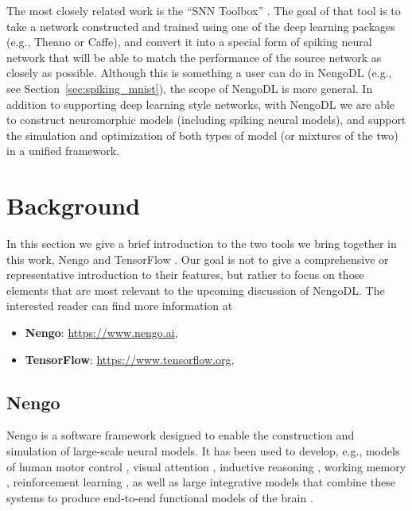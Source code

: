 \documentclass{article}
\begin{document}
The most closely related work is the ``SNN Toolbox'' \citep{Rueckauer2017}.  The goal of that tool is to take a network constructed and trained using one of the deep learning packages (e.g., Theano or Caffe), and convert it into a special form of spiking neural network that will be able to match the performance of the source network as closely as possible.  Although this is something a user can do in NengoDL (e.g., see Section~\ref{sec:spiking_mnist}), the scope of NengoDL is more general.  In addition to supporting deep learning style networks, with NengoDL we are able to construct neuromorphic models (including spiking neural models), and support the simulation and optimization of both types of model (or mixtures of the two) in a unified framework.

\section{Background}
\label{sec:background}

In this section we give a brief introduction to the two tools we bring together in this work, Nengo \citep{Bekolay2014} and TensorFlow \citep{Abadi2016}.  Our goal is not to give a comprehensive or representative introduction to their features, but rather to focus on those elements that are most relevant to the upcoming discussion of NengoDL.  The interested reader can find more information at

\begin{itemize}
\item {\bf Nengo}: \url{https://www.nengo.ai}, \citet{Bekolay2014}
\item {\bf TensorFlow}: \url{https://www.tensorflow.org}, \citet{Abadi2016}
\end{itemize}

\subsection{Nengo}

Nengo is a software framework designed to enable the construction and simulation of large-scale neural models.  It has been used to develop, e.g., models of human motor control \citep{DeWolf2016}, visual attention \citep{Bobier2014}, inductive reasoning \citep{Rasmussen2014}, working memory \citep{Choo2010}, reinforcement learning \citep{Stewart2012,Rasmussen2017}, as well as large integrative models that combine these systems to produce end-to-end functional models of the brain \citep{Eliasmith2012a}.
\end{document}
